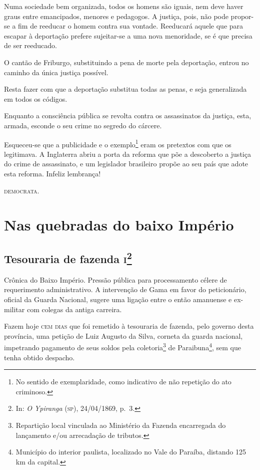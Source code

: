 Numa sociedade bem organizada, todos os homens são iguais, nem deve
haver graus entre emancipados, menores e pedagogos. A justiça, pois, não
pode propor-se a fim de reeducar o homem contra sua vontade. Reeducará
aquele que para escapar à deportação prefere sujeitar-se a uma nova
menoridade, se é que precisa de ser reeducado.

O cantão de Friburgo, substituindo a pena de morte pela deportação,
entrou no caminho da única justiça possível.

Resta fazer com que a deportação substitua todas as penas, e seja
generalizada em todos os códigos.

Enquanto a consciência pública se revolta contra os assassinatos da
justiça, esta, armada, esconde o seu crime no segredo do cárcere.

Esqueceu-se que a publicidade e o exemplo\footnote{No sentido de
  exemplaridade, como indicativo de não repetição do ato criminoso.}
eram os pretextos com que os legitimava. A Inglaterra abriu a porta da
reforma que põe a descoberto a justiça do crime de assassinato, e um
legislador brasileiro propõe ao seu país que adote esta reforma. Infeliz
lembrança!
\begin{flushright}
\textsc{democrata}.
\end{flushright}

\part{Nas quebradas do baixo Império} %

\chapter{Tesouraria de fazenda \textsc{i}\footnote{In: \emph{O Ypiranga} (\textsc{sp}),
  24/04/1869, p.~3.}}

\begin{didascalia}
Crônica do Baixo Império. Pressão pública para processamento célere de
requerimento administrativo. A intervenção de Gama em favor do
peticionário, oficial da Guarda Nacional, sugere uma ligação entre o
então amanuense e ex-militar com colegas da antiga carreira.
\end{didascalia}


Fazem hoje \textsc{cem dias} que foi remetido à tesouraria de fazenda, pelo
governo desta província, uma petição de Luiz Augusto da Silva, corneta
da guarda nacional, impetrando pagamento de seus soldos pela
coletoria\footnote{Repartição local vinculada ao Ministério da Fazenda
  encarregada do lançamento e/ou arrecadação de tributos.} de
Paraibuna\footnote{Município do interior paulista, localizado no Vale
  do Paraíba, distando 125 km da capital.}, sem que tenha obtido
despacho.


